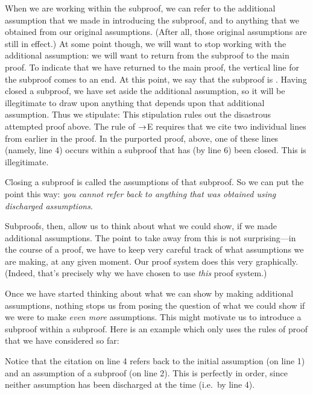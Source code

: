 When we are working within the subproof, we can refer to the additional assumption that we made in introducing the subproof, and to anything that we obtained from our original assumptions. (After all, those original assumptions are still in effect.) At some point though, we will want to stop working with the additional assumption: we will want to return from the subproof to the main proof. To indicate that we have returned to the main proof, the vertical line for the subproof comes to an end. At this point, we say that the subproof is . Having closed a subproof, we have set aside the additional assumption, so it will be illegitimate to draw upon anything that depends upon that additional assumption. Thus we stipulate:
This stipulation rules out the disastrous attempted proof above. The rule of $\rightarrow$E requires that we cite two individual lines from earlier in the proof. In the purported proof, above, one of these lines (namely, line 4) occurs within a subproof that has (by line 6) been closed. This is illegitimate. 

Closing a subproof is called  the assumptions of that subproof. So we can put the point this way: \emph{you cannot refer back to anything that was obtained using discharged assumptions}. 

Subproofs, then, allow us to think about what we could show, if we made additional assumptions. The point to take away from this is not surprising---in the course of a proof, we have to keep very careful track of what assumptions we are making, at any given moment. Our proof system does this very graphically. (Indeed, that's precisely why we have chosen to use \emph{this} proof system.)

Once we have started thinking about what we can show by making additional assumptions, nothing stops us from posing the question of what we could show if we were to make \emph{even more} assumptions. This might motivate us to introduce a subproof within a subproof. Here is an example which only uses the rules of proof that we have considered so far:
\begin{pf}
\open
	\open
	\close
\close
{}
\end{pf}
Notice that the citation on line 4 refers back to the initial assumption (on line 1) and an assumption of a subproof (on line 2). This is perfectly in order, since neither assumption has been discharged at the time (i.e.\ by line 4).

